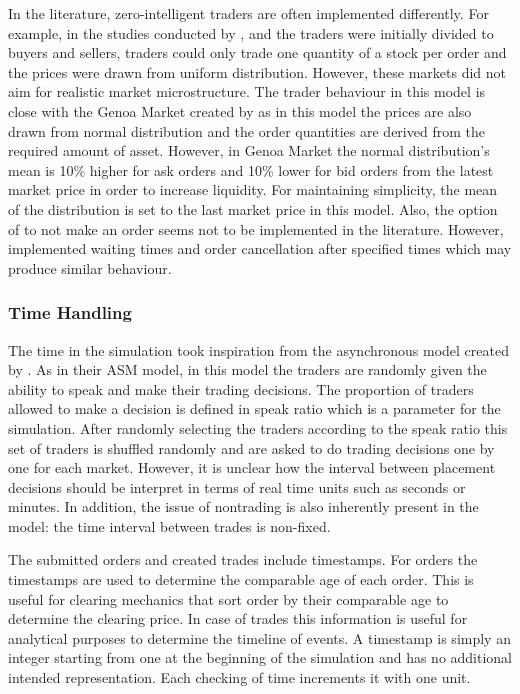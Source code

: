 In the literature, zero-intelligent traders are often implemented differently. For example, in the studies conducted by 
\citet{God93}, \citet{Jam96} and \citet{Mil08} the traders were initially divided to buyers and
sellers, traders could only trade one quantity of a stock per order and the prices
were drawn from uniform distribution. However, these markets did not aim for
realistic market microstructure. The trader behaviour in this model is close with the Genoa Market
created by \citet{Genoa01} as in this model the prices are also drawn from normal distribution and
the order quantities are derived from the required amount of asset. However, in Genoa Market the
normal distribution's mean is 10\% higher for ask orders and 10\% lower for bid orders from the
latest market price in order to increase liquidity. For maintaining simplicity, the mean of the distribution
is set to the last market price in this model. Also, the option of to not make an order seems not to be
implemented in the literature. However, \citet{Raberto05} implemented waiting times and order cancellation
after specified times which may produce similar behaviour. 

\subsubsection{Time Handling}

The time in the simulation took inspiration from the asynchronous model created by \citet{Julien07}. 
As in their ASM model, in this model the traders are randomly given the ability to speak and make 
their trading decisions. The proportion of traders allowed to make a decision is defined in
speak ratio which is a parameter for the simulation. After randomly selecting the traders
according to the speak ratio this set of traders is shuffled randomly and are asked to do trading 
decisions one by one for each market. However, it is unclear how the interval between placement 
decisions should be interpret in terms of real time units such as seconds or minutes. In addition, 
the issue of nontrading is also inherently present in the model: the time interval between trades 
is non-fixed.

The submitted orders and created trades include timestamps. For orders the timestamps are used
to determine the comparable age of each order. This is useful for clearing mechanics that sort 
order by their comparable age to determine the clearing price. In case of trades this information
is useful for analytical purposes to determine the timeline of events. A timestamp is simply 
an integer starting from one at the beginning of the simulation and has no additional 
intended representation. Each checking of time increments it with one unit.

